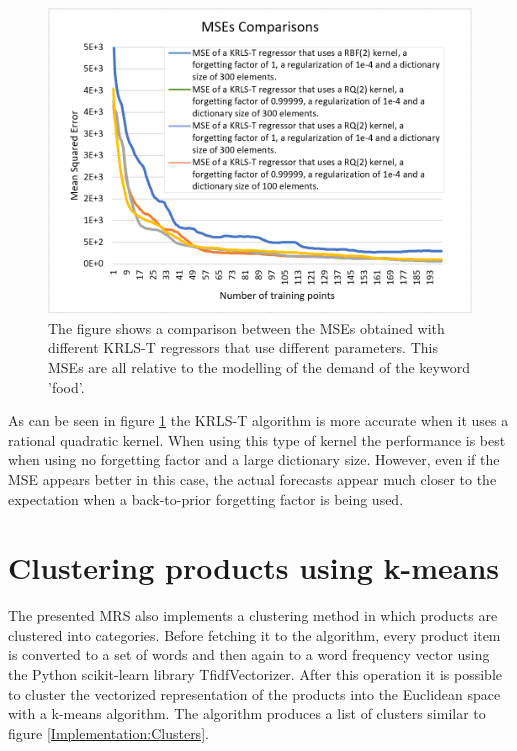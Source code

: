 \begin{figure}[H]
	\centering
	\includegraphics[scale=0.7]{img/mses.png}
	\caption{The figure shows a comparison between the MSEs obtained with different KRLS-T regressors that use different parameters. This MSEs are all relative to the modelling of the demand of the keyword 'food'.}
	\label{Implementation:MSEs}
\end{figure} 

As can be seen in figure \ref{Implementation:MSEs} the KRLS-T algorithm is more accurate when it uses a rational quadratic kernel. When using this type of kernel the performance is best when using no forgetting factor and a large dictionary size. However, even if the MSE appears better in this case, the actual forecasts appear much closer to the expectation when a back-to-prior forgetting factor is being used.

\newpage
\section{Clustering products using k-means}
The presented \ac{MRS} also implements a clustering method in which products are clustered into categories. Before fetching it to the algorithm, every product item is converted to a set of words and then again to a word frequency vector using the Python scikit-learn library TfidfVectorizer. After this operation it is possible to cluster the vectorized representation of the products into the Euclidean space with a k-means algorithm. The algorithm produces a list of clusters similar to figure \ref{Implementation:Clusters}.

